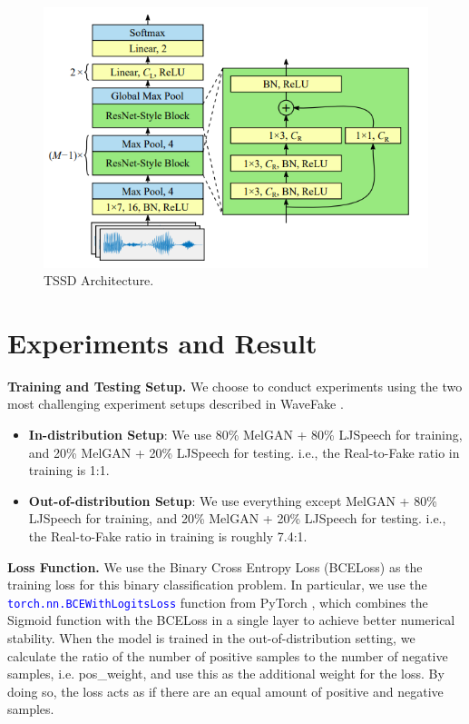 \documentclass{article}
\begin{document}
\begin{figure}[htbp]
    \centering
    \includegraphics[width=\textwidth]{tssd.png}
    \caption{TSSD Architecture.}
    \label{fig:tssd_archi}
\end{figure}

\section{Experiments and Result}

\textbf{Training and Testing Setup.} We choose to conduct experiments using the two most challenging experiment setups described in WaveFake \cite{frank2021wavefake}.
\begin{itemize}
    \item \textbf{In-distribution Setup}: We use 80\% MelGAN + 80\% LJSpeech for training, and 20\% MelGAN + 20\% LJSpeech for testing. i.e., the Real-to-Fake ratio in training is 1:1.
    \item \textbf{Out-of-distribution Setup}: We use everything except MelGAN + 80\% LJSpeech for training, and 20\% MelGAN + 20\% LJSpeech for testing. i.e., the Real-to-Fake ratio in training is roughly 7.4:1.
\end{itemize}
\textbf{Loss Function.} We use the Binary Cross Entropy Loss (BCELoss) as the training loss for this binary classification problem. In particular, we use the  \textcolor{blue}{\texttt{torch.nn.BCEWithLogitsLoss}} function from PyTorch \cite{NEURIPS2019_9015}, which combines the Sigmoid function with the BCELoss in a single layer to achieve better numerical stability. When the model is trained in the out-of-distribution setting, we calculate the ratio of the number of positive samples to the number of negative samples, i.e. pos\_weight, and use this as the additional weight for the loss. By doing so, the loss acts as if there are an equal amount of positive and negative samples.
\end{document}
